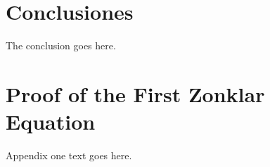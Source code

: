 \documentclass[journal,comsoc]{IEEEtran}
\begin{document}




\section{Conclusiones}
The conclusion goes here.






%


\appendices
\section{Proof of the First Zonklar Equation}
Appendix one text goes here.

\end{document}
